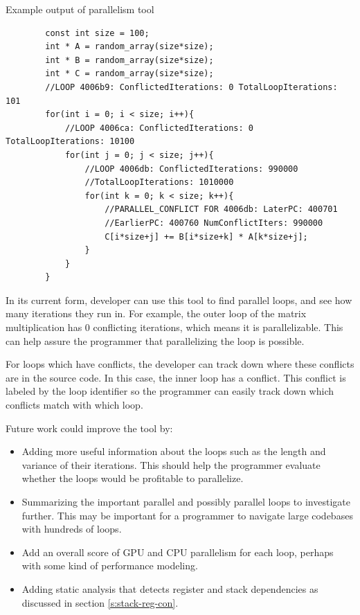 \documentclass[12pt,twoside]{reedthesis}
\newenvironment{codeexample}[1][htb]
{\floatname{algorithm}{Code Example}%
	\begin{algorithm}[#1]%
	}{\end{algorithm}}
\begin{document}
		\begin{codeexample}
			\caption{Example output of parallelism tool}
			\label{ce:par-tool-output}
		\begin{verbatim}
		const int size = 100;
		int * A = random_array(size*size);
		int * B = random_array(size*size);
		int * C = random_array(size*size);
		//LOOP 4006b9: ConflictedIterations: 0 TotalLoopIterations: 101
		for(int i = 0; i < size; i++){
		    //LOOP 4006ca: ConflictedIterations: 0 TotalLoopIterations: 10100 
		    for(int j = 0; j < size; j++){
		        //LOOP 4006db: ConflictedIterations: 990000
		        //TotalLoopIterations: 1010000
		        for(int k = 0; k < size; k++){
		            //PARALLEL_CONFLICT FOR 4006db: LaterPC: 400701
		            //EarlierPC: 400760 NumConflictIters: 990000
		            C[i*size+j] += B[i*size+k] * A[k*size+j];
		        }
		    }
		}
		\end{verbatim}
		\end{codeexample}
	
		In its current form, developer can use this tool to find parallel loops, and see how many iterations they run in. For example, the outer loop of the matrix multiplication has 0 conflicting iterations, which means it is parallelizable. This can help assure the programmer that parallelizing the loop is possible. 
		
		For loops which have conflicts, the developer can track down where these conflicts are in the source code. In this case, the inner loop has a conflict. This conflict is labeled by the loop identifier so the programmer can easily track down which conflicts match with which loop. %
		 
		Future work could improve the tool by:
		
		\begin{itemize}
			\item Adding more useful information about the loops such as the length and variance of their iterations. This should help the programmer evaluate whether the loops would be profitable to parallelize.
			\item Summarizing the important parallel and possibly parallel loops to investigate further. This may be important for a programmer to navigate large codebases with hundreds of loops. 
			\item  Add an overall score of GPU and CPU parallelism for each loop, perhaps with some kind of performance modeling. 
			\item  Adding static analysis that detects register and stack dependencies as discussed in  section \ref{s:stack-reg-con}.
		\end{itemize} 
	
\end{document}
